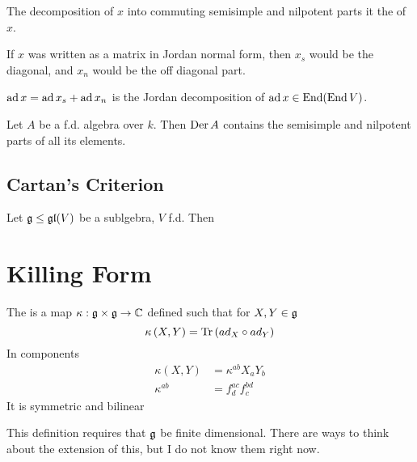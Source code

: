 \documentclass{article}
\begin{document}
\begin{definition}
	The decomposition of $x$ into commuting semisimple and nilpotent parts it the  of $x$. 
\end{definition}

\begin{remark}
	If $x$ was written as a matrix in Jordan normal form, then $x_s$ would be the diagonal, and $x_n$ would be the off diagonal part.   
\end{remark}

\begin{lemma}
	$\operatorname{ad} x = \operatorname{ad} x_s + \operatorname{ad} x_n$ is the Jordan decomposition of $\operatorname{ad} x \in \operatorname{End}(\operatorname{End} V)$. 
\end{lemma}

\begin{lemma}
Let $A$ be a f.d. algebra over $k$. Then $\operatorname{Der} A$ contains the semisimple and nilpotent parts of all its elements. 
\end{lemma}

\subsection{Cartan's Criterion}

\begin{theorem}
	Let $\mathfrak{g} \leq \mathfrak{gl}(V)$ be a sublgebra, $V$ f.d. Then 
\end{theorem}

\section{Killing Form}
\begin{definition}
	The  is a map $\kappa:\mathfrak{g}\times\mathfrak{g}\to\mathbb{C}$ defined such that for $X,Y\in\mathfrak{g}$
	\[
	\kappa\left(X,Y\right)=\operatorname{Tr}\left(ad_X \circ ad_Y\right)
	\]
	In components 
	\begin{align*}
	\kappa(X,Y) &= \kappa^{ab}X_a Y_b \\
	\kappa^{ab} &= f^{ac}_d f^{bd}_c
	\end{align*}
	It is symmetric and bilinear 
\end{definition}

\begin{remark}
This definition requires that $\mathfrak{g}$ be finite dimensional. There are ways to think about the extension of this, but I do not know them right now. 
\end{remark}
\end{document}
